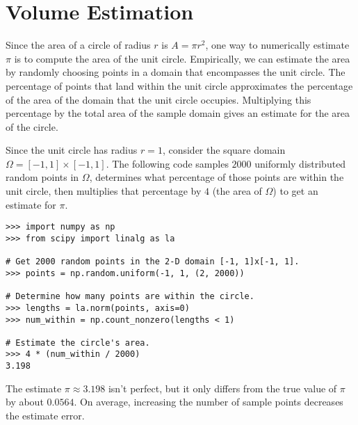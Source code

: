 \labdependencies{}

\section*{Volume Estimation} %

Since the area of a circle of radius $r$ is $A = \pi r^2$, one way to numerically estimate $\pi$ is to compute the area of the unit circle.
Empirically, we can estimate the area by randomly choosing points in a domain that encompasses the unit circle.
The percentage of points that land within the unit circle approximates the percentage of the area of the domain that the unit circle occupies.
Multiplying this percentage by the total area of the sample domain gives an estimate for the area of the circle.

Since the unit circle has radius $r=1$, consider the square domain $\Omega=[-1,1]\times[-1,1]$.
The following code samples $2000$ uniformly distributed random points in $\Omega$, determines what percentage of those points are within the unit circle, then multiplies that percentage by $4$ (the area of $\Omega$) to get an estimate for $\pi$.

\begin{lstlisting}
>>> import numpy as np
>>> from scipy import linalg as la

# Get 2000 random points in the 2-D domain [-1, 1]x[-1, 1].
>>> points = np.random.uniform(-1, 1, (2, 2000))

# Determine how many points are within the circle.
>>> lengths = la.norm(points, axis=0)
>>> num_within = np.count_nonzero(lengths < 1)

# Estimate the circle's area.
>>> 4 * (num_within / 2000)
3.198
\end{lstlisting}

The estimate $\pi \approx 3.198$ isn't perfect, but it only differs from the true value of $\pi$ by about $0.0564$.
On average, increasing the number of sample points decreases the estimate error.


